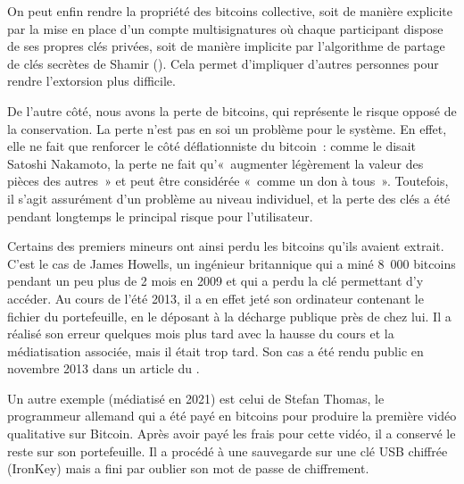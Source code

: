 On peut enfin rendre la propriété des bitcoins collective, soit de manière explicite par la mise en place d'un compte multisignatures où chaque participant dispose de ses propres clés privées, soit de manière implicite par l'algorithme de partage de clés secrètes de Shamir (). Cela permet d'impliquer d'autres personnes pour rendre l'extorsion plus difficile.

De l'autre côté, nous avons la perte de bitcoins, qui représente le risque opposé de la conservation. La perte n'est pas en soi un problème pour le système. En effet, elle ne fait que renforcer le côté déflationniste du bitcoin~: comme le disait Satoshi Nakamoto, la perte ne fait qu'«~augmenter légèrement la valeur des pièces des autres~» et peut être considérée «~comme un don à tous~». Toutefois, il s'agit assurément d'un problème au niveau individuel, et la perte des clés a été pendant longtemps le principal risque pour l'utilisateur.

Certains des premiers mineurs ont ainsi perdu les bitcoins qu'ils avaient extrait. C'est le cas de James Howells, un ingénieur britannique qui a miné 8~000 bitcoins pendant un peu plus de 2 mois en 2009 et qui a perdu la clé permettant d'y accéder. Au cours de l'été 2013, il a en effet jeté son ordinateur contenant le fichier du portefeuille, en le déposant à la décharge publique près de chez lui. Il a réalisé son erreur quelques mois plus tard avec la hausse du cours et la médiatisation associée, mais il était trop tard. Son cas a été rendu public en novembre 2013 dans un article du .

Un autre exemple (médiatisé en 2021) est celui de Stefan Thomas, le programmeur allemand qui a été payé en bitcoins pour produire la première vidéo qualitative sur Bitcoin. Après avoir payé les frais pour cette vidéo, il a conservé le reste sur son portefeuille. Il a procédé à une sauvegarde sur une clé USB chiffrée (IronKey) mais a fini par oublier son mot de passe de chiffrement.

